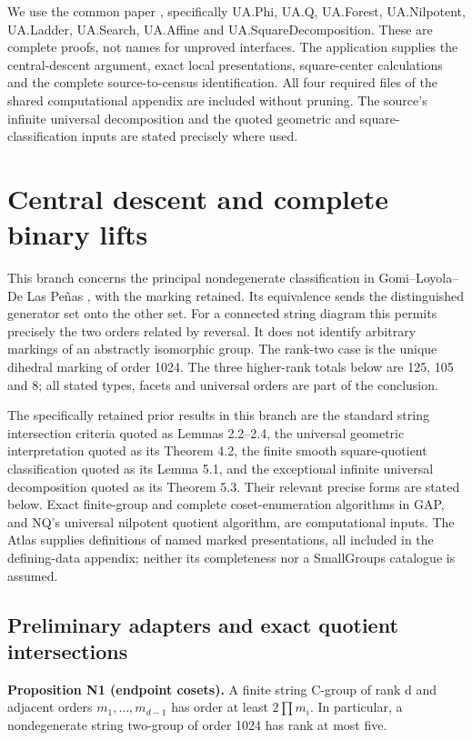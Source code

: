 We use the common paper \cite{UA}, specifically UA.Phi, UA.Q,
UA.Forest, UA.Nilpotent, UA.Ladder, UA.Search, UA.Affine and
UA.SquareDecomposition. These are complete proofs, not names for
unproved interfaces. The application supplies the central-descent
argument, exact local presentations, square-center calculations and
the complete source-to-census identification. All four required files
of the shared computational appendix are included without pruning.
The source's infinite universal decomposition and the quoted geometric
and square-classification inputs are stated precisely where used.
\section{Central descent and complete binary lifts}\label{central-descent-and-complete-binary-lifts}

This branch concerns the principal nondegenerate classification in Gomi--Loyola--De Las Peñas \cite{GLP}, with the marking retained. Its equivalence sends the distinguished generator set onto the other set. For a connected string diagram this permits precisely the two orders related by reversal. It does not identify arbitrary markings of an abstractly isomorphic group. The rank-two case is the unique dihedral marking of order 1024. The three higher-rank totals below are 125, 105 and 8; all stated types, facets and universal orders are part of the conclusion.

The specifically retained prior results in this branch are the standard string intersection criteria quoted as \cite{GLP} Lemmas 2.2--2.4, the universal geometric interpretation quoted as its Theorem 4.2, the finite smooth square-quotient classification quoted as its Lemma 5.1, and the exceptional infinite universal decomposition quoted as its Theorem 5.3. Their relevant precise forms are stated below. Exact finite-group and complete coset-enumeration algorithms in GAP, and NQ's universal nilpotent quotient algorithm, are computational inputs. The Atlas supplies definitions of named marked presentations, all included in the defining-data appendix; neither its completeness nor a SmallGroups catalogue is assumed.

\subsection{Preliminary adapters and exact quotient intersections}\label{preliminary-adapters-and-exact-quotient-intersections}

\textbf{Proposition N1 (endpoint cosets).} A finite string C-group of rank d and adjacent orders \(m_{1},\ldots,m_{d-1}\) has order at least \(2\prod m_{i}\). In particular, a nondegenerate string two-group of order 1024 has rank at most five.

